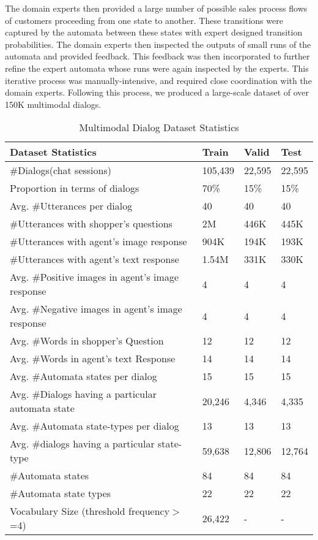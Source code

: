 \documentclass[letterpaper]{article} %
\begin{document}
The domain experts then provided a large number of possible sales process flows of customers proceeding from one state to another. These transitions were captured by the automata between these states with expert designed transition probabilities. The domain experts then inspected the outputs of small runs of the automata and provided feedback. This feedback was then incorporated to further refine the expert automata whose runs were again inspected by the experts. This iterative process was manually-intensive, and required close coordination with the domain experts. Following this process, we produced a large-scale dataset of over 150K multimodal dialogs.



\begin{table}
{\tiny
\captionsetup{font=small}
\begin{center}
\begin{tabular}{|p{4.2cm}|p{.75cm}|p{.75cm}|p{.75cm}|}\hline
\textbf{Dataset Statistics} & \textbf{Train} & \textbf{Valid} & \textbf{Test} \\ \hline
\#Dialogs(chat sessions) & 105,439 & 22,595 & 22,595 \\ \hline
Proportion in terms of dialogs & 70\% & 15\% & 15\% \\ \hline
Avg. \#Utterances per dialog & 40 & 40 & 40\\\hline
\#Utterances with shopper's questions & 2M & 446K & 445K \\\hline
\#Utterances with agent's image response & 904K & 194K & 193K \\\hline
\#Utterances with agent's text response & 1.54M &331K & 330K \\\hline
Avg. \#Positive images in agent's image response & 4 & 4 & 4 \\\hline
Avg. \#Negative images in agent's image response & 4 & 4 & 4\\\hline
Avg. \#Words in shopper's Question & 12 & 12 & 12\\\hline
Avg. \#Words in agent's text Response & 14 & 14 & 14\\\hline
Avg. \#Automata states per dialog & 15 & 15 & 15\\\hline
Avg. \#Dialogs having a particular automata state & 20,246 & 4,346 & 4,335\\ \hline
Avg. \#Automata state-types per dialog & 13 & 13 & 13\\\hline
Avg. \#dialogs having a particular state-type & 59,638 & 12,806 & 12,764\\\hline
\#Automata states & 84 & 84  & 84 \\\hline
\#Automata state types & 22 & 22 & 22 \\\hline
Vocabulary Size (threshold frequency$>$=4) & 26,422 & - & -\\\hline
\end{tabular}
\end{center}
}
\caption{Multimodal Dialog Dataset Statistics}
\label{tab:dataset_stats}
\end{table}
\end{document}

